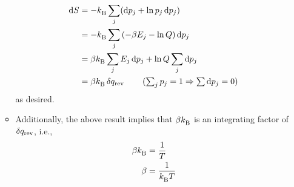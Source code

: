 \documentclass[../notes.tex]{subfiles}
\begin{document}
\begin{itemize}
\begin{itemize}
\begin{align*}
            \dd{S} &= -\kB\sum_j(\dd{p_j}+\ln p_j\dd{p_j})\\
            &= -\kB\sum_j\left( -\beta E_j-\ln Q \right)\dd{p_j}\\
            &= \beta\kB\sum_jE_j\dd{p_j}+\ln Q\sum_j\dd{p_j}\\
            &= \beta\kB\var{q_\text{rev}}\tag{$\sum_jp_j=1\Rightarrow\sum\dd{p_j}=0$}
        \end{align*}
        \endgroup
        as desired.
        \item Additionally, the above result implies that $\beta{k_\text{B}^{}}$ is an integrating factor of $\var{q_\text{rev}}$, i.e.,
        \begin{align*}
            \beta{k_\text{B}^{}} &= \frac{1}{T}\\
            \beta &= \frac{1}{{k_\text{B}^{}} T}
        \end{align*}
    \end{itemize}
\end{itemize}
\end{document}
